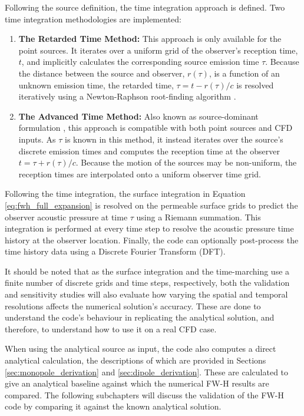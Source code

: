 Following the source definition, the time integration approach is defined. Two time integration methodologies are implemented:
\begin{enumerate}
    \item \textbf{The Retarded Time Method:} This approach is only available for the point sources. It iterates over a uniform grid of the observer's reception time, $t$, and implicitly calculates the corresponding source emission time $\tau$. Because the distance between the source and observer, $r(\tau)$, is a function of an unknown emission time, the retarded time, $\tau=t-r(\tau)/c$ is resolved iteratively using a Newton-Raphson root-finding algorithm \cite{TingChar2024}.
    \item \textbf{The Advanced Time Method:} Also known as source-dominant formulation \cite{casalino-2001}, this approach is compatible with both point sources and CFD inputs. As $\tau$ is known in this method, it instead iterates over the source's discrete emission times and computes the reception time at the observer $t=\tau+r(\tau)/c$. Because the motion of the sources may be non-uniform, the reception times are interpolated onto a uniform observer time grid.
\end{enumerate}

Following the time integration, the surface integration in Equation \ref{eq:fwh_full_expansion} is resolved on the permeable surface grids to predict the observer acoustic pressure at time $\tau$ using a Riemann summation. This integration is performed at every time step to resolve the acoustic pressure time history at the observer location. Finally, the code can optionally post-process the time history data using a Discrete Fourier Transform (DFT).

It should be noted that as the surface integration and the time-marching use a finite number of discrete grids and time steps, respectively, both the validation and sensitivity studies will also evaluate how varying the spatial and temporal resolutions affects the numerical solution's accuracy. These are done to understand the code's behaviour in replicating the analytical solution, and therefore, to understand how to use it on a real CFD case.

When using the analytical source as input, the code also computes a direct analytical calculation, the descriptions of which are provided in Sections \ref{sec:monopole_derivation} and \ref{sec:dipole_derivation}. These are calculated to give an analytical baseline against which the numerical FW-H results are compared. The following subchapters will discuss the validation of the FW-H code by comparing it against the known analytical solution.

